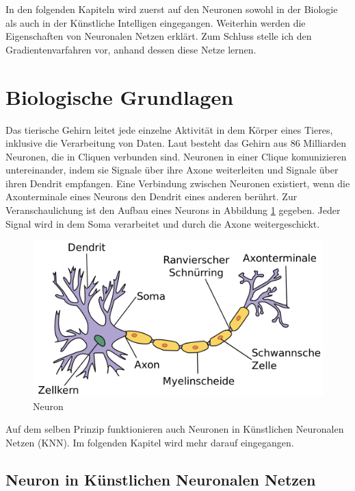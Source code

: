 In den folgenden Kapiteln wird zuerst auf den Neuronen sowohl in der Biologie als auch in der Künstliche Intelligen eingegangen. Weiterhin werden die Eigenschaften von Neuronalen Netzen erklärt. Zum Schluss stelle ich den Gradientenvarfahren vor, anhand dessen diese Netze lernen.

\section{Biologische Grundlagen}

Das tierische Gehirn leitet jede einzelne Aktivität in dem Körper eines Tieres, inklusive die Verarbeitung von Daten. Laut \cite{GEHIRN:12} besteht das Gehirn aus 86 Milliarden Neuronen, die in Cliquen verbunden sind. Neuronen in einer Clique komunizieren untereinander, indem sie Signale über ihre Axone weiterleiten und Signale über ihren Dendrit empfangen. Eine Verbindung zwischen Neuronen existiert, wenn die Axonterminale eines Neurons den Dendrit eines anderen berührt. Zur Veranschaulichung ist den Aufbau eines Neurons in Abbildung \ref{neuron} gegeben. Jeder Signal wird in dem Soma verarbeitet und durch die Axone weitergeschickt.

\begin{figure}[!htbp]
	\centering
	\includegraphics[scale=0.2]{images/Neuron_(deutsch)-1.png}
	\caption{Neuron \cite{NWIKI:19}}\label{neuron}
\end{figure}

Auf dem selben Prinzip funktionieren auch Neuronen in Künstlichen Neuronalen Netzen (KNN). Im folgenden Kapitel wird mehr darauf eingegangen. \cite{NWIKI:19} \cite{GEHIRN:12}

\subsection{Neuron in Künstlichen Neuronalen Netzen}

